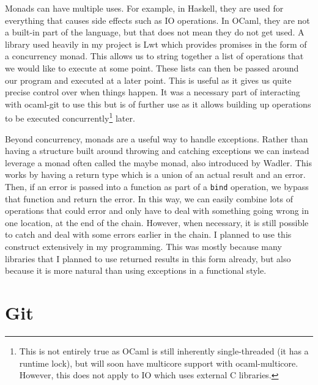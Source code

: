 Monads can have multiple uses. For example, in Haskell, they are used for everything that causes side effects such as IO operations. In OCaml, they are not a built-in part of the language, but that does not mean they do not get used. A library used heavily in my project is Lwt\cite{code_lwt} which provides promises\cite{Liskov1988} in the form of a concurrency monad. This allows us to string together a list of operations that we would like to execute at some point. These lists can then be passed around our program and executed at a later point. This is useful as it gives us quite precise control over when things happen. It was a necessary part of interacting with ocaml-git to use this but is of further use as it allows building up operations to be executed concurrently\footnote{This is not entirely true as OCaml is still inherently single-threaded (it has a runtime lock), but will soon have multicore support with ocaml-multicore\cite{dolan2014multicore}. However, this does not apply to IO which uses external C libraries.} later.

Beyond concurrency, monads are a useful way to handle exceptions. Rather than having a structure built around throwing and catching exceptions we can instead leverage a monad often called the maybe monad, also introduced by Wadler\cite{wadler90monads}. This works by having a return type which is a union of an actual result and an error. Then, if an error is passed into a function as part of a \texttt{bind} operation, we bypass that function and return the error. In this way, we can easily combine lots of operations that could error and only have to deal with something going wrong in one location, at the end of the chain. However, when necessary, it is still possible to catch and deal with some errors earlier in the chain. I planned to use this construct extensively in my programming. This was mostly because many libraries that I planned to use returned results in this form already, but also because it is more natural than using exceptions in a functional style.

\section{Git} \label{section:git}

